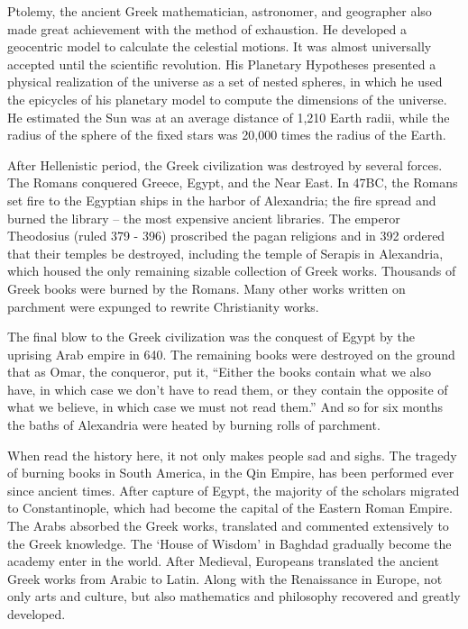 \documentclass{article}
\begin{document}
Ptolemy, the ancient Greek mathematician, astronomer, and geographer also made great achievement with the method of exhaustion. He developed a geocentric model to calculate the celestial motions. It was almost universally accepted until the scientific revolution. His Planetary Hypotheses presented a physical realization of the universe as a set of nested spheres, in which he used the epicycles of his planetary model to compute the dimensions of the universe. He estimated the Sun was at an average distance of 1,210 Earth radii, while the radius of the sphere of the fixed stars was 20,000 times the radius of the Earth.

After Hellenistic period, the Greek civilization was destroyed by several forces. The Romans conquered Greece, Egypt, and the Near East. In 47BC, the Romans set fire to the Egyptian ships in the harbor of Alexandria; the fire spread and burned the library -- the most expensive ancient libraries. The emperor Theodosius (ruled 379 - 396) proscribed the pagan religions and in 392 ordered that their temples be destroyed, including the temple of Serapis in Alexandria, which housed the only remaining sizable collection of Greek works. Thousands of Greek books were burned by the Romans. Many other works written on parchment were expunged to rewrite Christianity works.

The final blow to the Greek civilization was the conquest of Egypt by the uprising Arab empire in 640. The remaining books were destroyed on the ground that as Omar, the conqueror, put it, ``Either the books contain what we also have, in which case we don't have to read them, or they contain the opposite of what we believe, in which case we must not read them.'' And so for six months the baths of Alexandria were heated by burning rolls of parchment\cite{M-Kline-2007}.

When read the history here, it not only makes people sad and sighs. The tragedy of burning books in South America, in the Qin Empire, has been performed ever since ancient times. After capture of Egypt, the majority of the scholars migrated to Constantinople, which had become the capital of the Eastern Roman Empire. The Arabs absorbed the Greek works, translated and commented extensively to the Greek knowledge. The `House of Wisdom' in Baghdad gradually become the academy enter in the world. After Medieval, Europeans translated the ancient Greek works from Arabic to Latin. Along with the Renaissance in Europe, not only arts and culture, but also mathematics and philosophy recovered and greatly developed.
\end{document}
